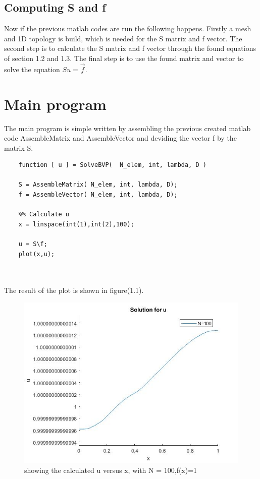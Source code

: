 \documentclass{report}
\begin{document}
\subsection{Computing S and f}

Now if the previous matlab codes are run the following happens. Firstly a mesh and 1D topology is build, which is needed for the S matrix and f vector. The second step is to calculate the S matrix and f vector through the found equations of section 1.2 and 1.3. The final step is to use the found matrix and vector to solve the equation $Su=\vec{f}$.





\section{Main program}

The main program is simple written by assembling the previous created matlab code AssembleMatrix and AssembleVector and deviding the vector f by the matrix S.
\begin{lstlisting}
	function [ u ] = SolveBVP(  N_elem, int, lambda, D )
	
	S = AssembleMatrix( N_elem, int, lambda, D);
	f = AssembleVector( N_elem, int, lambda, D);
	
	%% Calculate u
	x = linspace(int(1),int(2),100);
	
	u = S\f;
	plot(x,u); 
	
	
\end{lstlisting}
The result of the plot is shown in figure(1.1).

\begin{figure}[ht!]
	\centering
	\includegraphics[width=150mm]{1Df1.jpg}
	\caption{showing the calculated u versus x, with N = 100,f(x)=1 \label{overflow}}
\end{figure}
\end{document}

